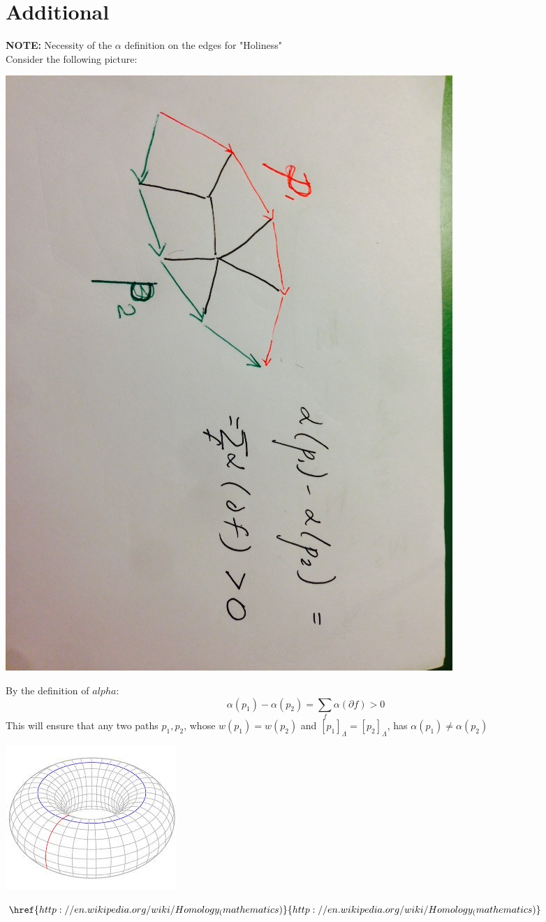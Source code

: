 \documentclass{article}
\begin{document}
\section{Additional}
\textbf{NOTE: } Necessity of the $\alpha$ definition on the edges for "Holiness" \\
Consider the following picture:
\begin{center}
\includegraphics[angle = 90, scale = 0.3]{alphaNec.jpg}
\end{center}
By the definition of $alpha$:
\[\alpha(p_1) - \alpha(p_2) = \sum_f \alpha(\partial f) > 0\]
This will ensure that any two paths $p_1, p_2$, whose $w(p_1) = w(p_2)$ and $[p_1]_{\Lambda} = [p_2]_{\Lambda}$, has $\alpha(p_1) \neq \alpha(p_2)$

\begin{center}
\includegraphics{torus.jpg}
\end{center}
$\href{http://en.wikipedia.org/wiki/Homology_(mathematics)}{http://en.wikipedia.org/wiki/Homology_(mathematics)}$
\newpage
\end{document}
